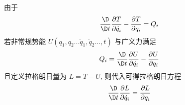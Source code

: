 
由于
\begin{equation}
\frac{\D}{{\D t}}\frac{{\partial T}}{{\partial {{\dot q}_i}}} - \frac{{\partial T}}{{\partial {q_i}}} = {Q_i}
\end{equation}
若非常规势能  $U({q_1},{q_2}...{\dot q_1},{\dot q_2}...,t)$ 与广义力满足
\begin{equation}
{Q_i} = \frac{\D}{{\D t}}\frac{{\partial U}}{{\partial {{\dot q}_i}}} - \frac{{\partial U}}{{\partial {q_i}}}
\end{equation}
且定义拉格朗日量为 $L = T - U$, 则代入可得拉格朗日方程
\begin{equation}
\frac{\D}{{\D t}}\frac{{\partial L}}{{\partial {{\dot q}_i}}} = \frac{{\partial L}}{{\partial {q_i}}}
\end{equation}


